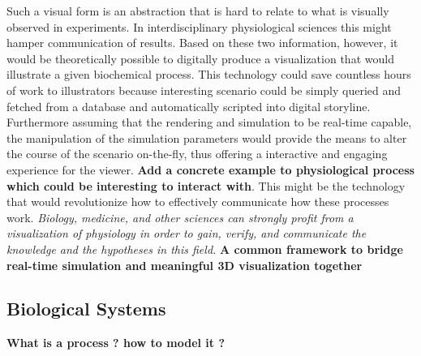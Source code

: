 Such a visual form is an abstraction that is hard to relate to what is visually observed in experiments. 
In interdisciplinary physiological sciences this might hamper communication of results. 
Based on these two information, however, it would be theoretically possible to digitally produce a visualization that would illustrate a given biochemical process.
This technology could save countless hours of work to illustrators because interesting scenario could be simply queried and fetched from a database and automatically scripted into digital storyline.
Furthermore assuming that the rendering and simulation to be real-time capable, the manipulation of the simulation parameters would provide the means to alter the course of the scenario on-the-fly, thus offering a interactive and engaging experience for the viewer.
\textbf{Add a concrete example to physiological process which could be interesting to interact with}.
This might be the technology that would revolutionize how to effectively communicate how these processes work.
\textit{Biology, medicine, and other sciences can strongly profit from a visualization of physiology in order to gain, verify, and communicate the knowledge and the hypotheses in this field.}
\textbf{A common framework to bridge real-time simulation and meaningful 3D visualization together}

%
%

\subsection{Biological Systems}

\textbf{What is a process ? how to model it ?}

